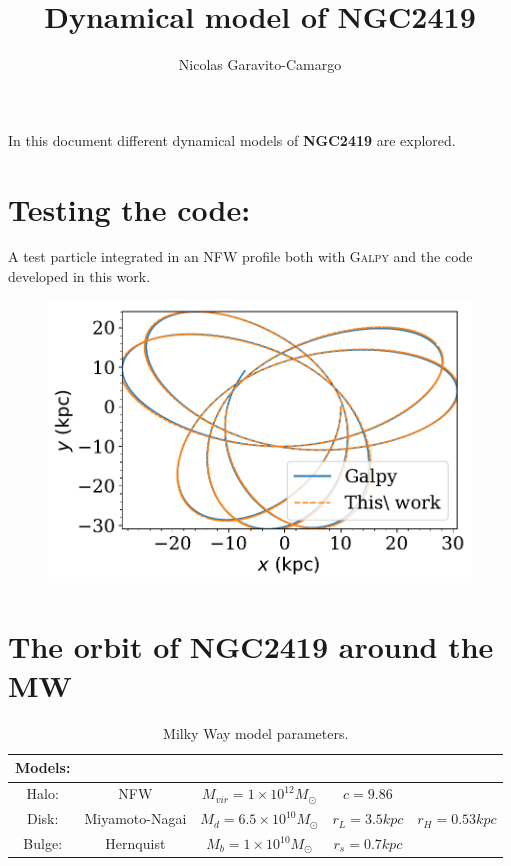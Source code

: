 \documentclass[14pt]{article}
\title{Dynamical model of NGC2419}
\author{Nicolas Garavito-Camargo}
\begin{document}
\maketitle


In this document different dynamical models of \textbf{NGC2419} are explored.


\section{Testing the code:}

A test particle integrated in an NFW profile both with \textsc{Galpy}
and the code developed in this work.

\begin{figure}[H]
\centering
\includegraphics[scale=0.5]{../exploratory_code/galpy_test.pdf}
\end{figure}


\section{The orbit of NGC2419 around the MW}

\begin{table}
\centering
\begin{tabular}{c c c c c}
\hline
\hline
\textbf{Models:} & & & & \\
\hline
Halo: & NFW & $M_{vir} = 1\times 10^{12} M_{\odot}$ & $c=9.86$  \\
Disk: & Miyamoto-Nagai & $M_{d} = 6.5\times10^{10} M_{\odot}$ & $r_L = 3.5 kpc$ & $r_H = 0.53 kpc$ \\
Bulge: & Hernquist & $M_b = 1 \times 10^{10} M_{\odot}$ & $r_s=0.7 kpc$ & \\
\hline
\hline
\end{tabular}
\caption{Milky Way model parameters.}
\end{table}
\end{document}
